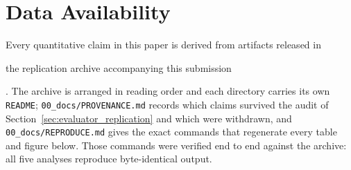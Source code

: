 %
%
%
%

\newif\ifecnanonymous
\ecnanonymoustrue          %

\newcommand{\ecnarchivedoi}{10.5281/zenodo.XXXXXXX}    %
\newcommand{\ecnarchiveurl}{https://doi.org/\ecnarchivedoi}
\newcommand{\ecnarchive}{%
  \ifecnanonymous
    the replication archive accompanying this submission%
  \else
    the replication archive (\href{\ecnarchiveurl}{\texttt{\ecnarchivedoi}})%
  \fi
}



\section*{Data Availability}

Every quantitative claim in this paper is derived from artifacts released in
\ecnarchive. The archive is arranged in reading order and each directory carries its own
\texttt{README}; \texttt{00\_docs/PROVENANCE.md} records which claims survived the audit
of Section~\ref{sec:evaluator_replication} and which were withdrawn, and
\texttt{00\_docs/REPRODUCE.md} gives the exact commands that regenerate every table and
figure below. Those commands were verified end to end against the archive: all five
analyses reproduce byte-identical output.

